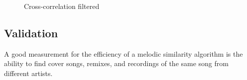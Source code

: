 \begin{figure}[htbp]
	\centering
	\caption{Cross-correlation filtered}
	\label{fig:crosscorr3}
\end{figure}
\FloatBarrier



\subsection{Validation}\label{chromavalid}
A good measurement for the efficiency of a melodic similarity algorithm is the ability to find cover songs, remixes, and recordings of the same song from different artists. 
